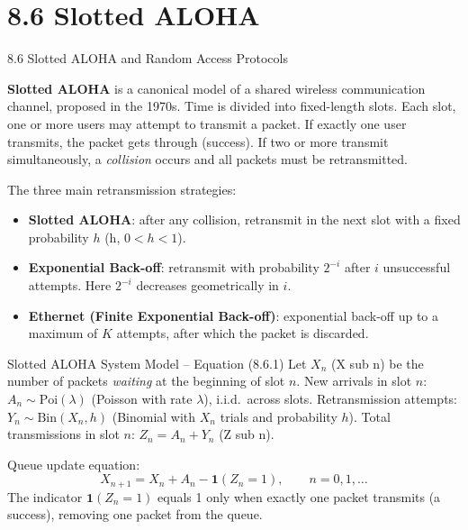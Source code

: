 \documentclass[aspectratio=169,10pt]{beamer}
\begin{document}
\section{8.6 Slotted ALOHA}

\begin{frame}[allowframebreaks]{8.6 Slotted ALOHA and Random Access Protocols}

\textbf{Slotted ALOHA} is a canonical model of a shared wireless communication
channel, proposed in the 1970s.  Time is divided into fixed-length slots.  Each
slot, one or more users may attempt to transmit a packet.  If exactly one user
transmits, the packet gets through (success).  If two or more transmit
simultaneously, a \emph{collision} occurs and all packets must be retransmitted.

The three main retransmission strategies:
\begin{itemize}
  \item \textbf{Slotted ALOHA}: after any collision, retransmit in the next slot
        with a fixed probability $h$ (h, $0 < h < 1$).
  \item \textbf{Exponential Back-off}: retransmit with probability $2^{-i}$ after
        $i$ unsuccessful attempts.  Here $2^{-i}$ decreases geometrically in $i$.
  \item \textbf{Ethernet (Finite Exponential Back-off)}: exponential back-off up
        to a maximum of $K$ attempts, after which the packet is discarded.
\end{itemize}

\begin{block}{Slotted ALOHA System Model -- Equation (8.6.1)}
Let $X_n$ (X sub n) be the number of packets \emph{waiting} at the beginning of
slot $n$.  New arrivals in slot $n$: $A_n \sim \mathrm{Poi}(\lambda)$ (Poisson
with rate $\lambda$), i.i.d.\ across slots.  Retransmission attempts:
$Y_n \sim \mathrm{Bin}(X_n, h)$ (Binomial with $X_n$ trials and probability $h$).
Total transmissions in slot $n$: $Z_n = A_n + Y_n$ (Z sub n).

Queue update equation:
\[
  X_{n+1} = X_n + A_n - \mathbf{1}(Z_n = 1), \qquad n = 0, 1, \ldots
\]
The indicator $\mathbf{1}(Z_n = 1)$ equals 1 only when exactly one packet
transmits (a success), removing one packet from the queue.
\end{block}

\framebreak


\end{frame}
\end{document}
